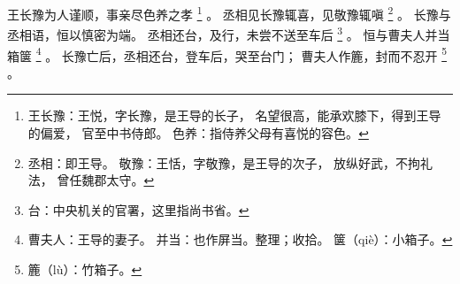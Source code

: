 
\switchcolumn*[\section{}]

王长豫为人谨顺，事亲尽色养之孝%
\footnote{%
    王长豫：王悦，字长豫，是王导的长子，
            名望很高，能承欢膝下，得到王导的偏爱，
            官至中书侍郎。
    色养：指侍养父母有喜悦的容色。
}%
。
丞相见长豫辄喜，见敬豫辄嗔%
\footnote{%
    丞相：即王导。
    敬豫：王恬，字敬豫，是王导的次子，
          放纵好武，不拘礼法，
          曾任魏郡太守。
}%
。
长豫与丞相语，恒以慎密为端。
丞相还台，及行，未尝不送至车后%
\footnote{%
    台：中央机关的官署，这里指尚书省。
}%
。
恒与曹夫人并当箱箧%
\footnote{%
    曹夫人：王导的妻子。
    并当：也作屏当。整理；收拾。
    箧（qiè）：小箱子。
}%
。
长豫亡后，丞相还台，登车后，哭至台门；
曹夫人作簏，封而不忍开%
\footnote{%
    簏（lù）：竹箱子。
}%
。

\switchcolumn


